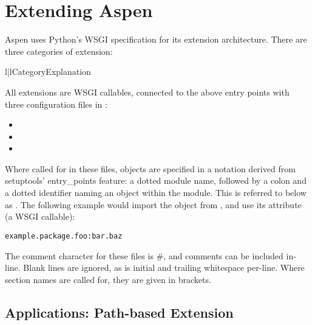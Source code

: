 \chapter{Extending Aspen \label{extending}}

Aspen uses Python's WSGI specification for its extension architecture. There are
three categories of extension:

\begin{tableii}{l|l}{}{Category}{Explanation}
\end{tableii}

All extensions are WSGI callables, connected to the above entry points with
three configuration files in :

\begin{itemize}
\item{}
\item{}
\item{}
\end{itemize}

Where called for in these files, objects are specified in a notation derived
from setuptools' entry_points feature: a dotted module name, followed by a colon
and a dotted identifier naming an object within the module. This is referred to
below as . The following example would import the 
object from , and use its  attribute (a WSGI
callable):

\begin{verbatim}
example.package.foo:bar.baz
\end{verbatim}

The comment character for these files is \#, and comments can be included
in-line. Blank lines are ignored, as is initial and trailing whitespace
per-line. Where section names are called for, they are given in brackets.


\section{Applications: Path-based Extension \label{apps}}

